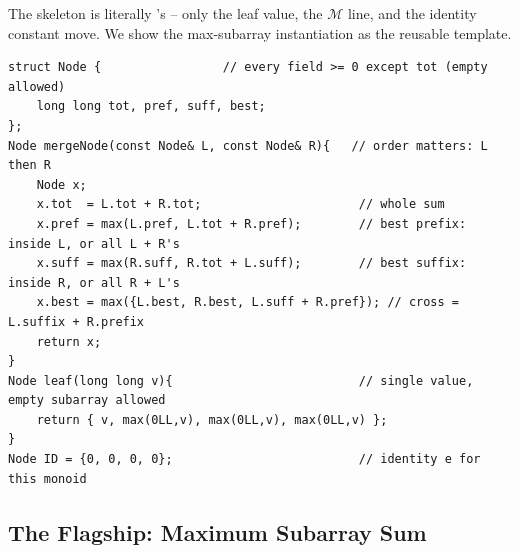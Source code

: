 The skeleton is literally 's -- only the leaf value, the
\(\mathcal{M}\) line, and the identity constant move.  We show the max-subarray
instantiation as the reusable template.

\begin{lstlisting}[caption={the max-subarray node and its O(1) merge: this is the whole "new" idea}, label={lst:c13-combine}]
struct Node {                 // every field >= 0 except tot (empty allowed)
    long long tot, pref, suff, best;
};
Node mergeNode(const Node& L, const Node& R){   // order matters: L then R
    Node x;
    x.tot  = L.tot + R.tot;                      // whole sum
    x.pref = max(L.pref, L.tot + R.pref);        // best prefix: inside L, or all L + R's
    x.suff = max(R.suff, R.tot + L.suff);        // best suffix: inside R, or all R + L's
    x.best = max({L.best, R.best, L.suff + R.pref}); // cross = L.suffix + R.prefix
    return x;
}
Node leaf(long long v){                          // single value, empty subarray allowed
    return { v, max(0LL,v), max(0LL,v), max(0LL,v) };
}
Node ID = {0, 0, 0, 0};                          // identity e for this monoid
\end{lstlisting}

\subsection{The Flagship: Maximum Subarray Sum}


